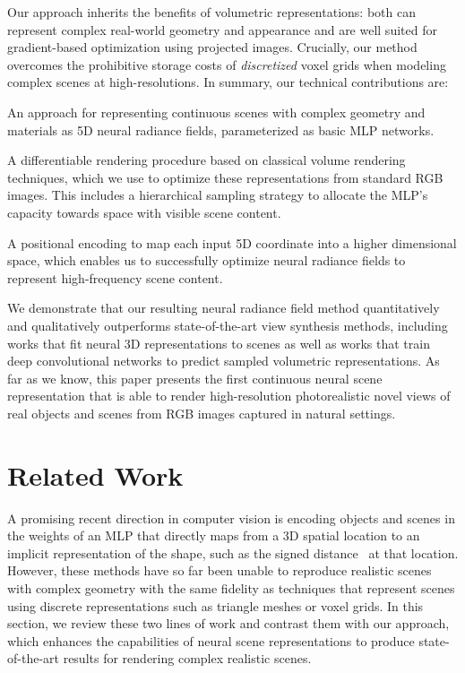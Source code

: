 \documentclass[runningheads]{llncs}
\begin{document}
Our approach inherits the benefits of volumetric representations: both can represent complex real-world geometry and appearance and are well suited for gradient-based optimization using projected images. Crucially, our method overcomes the prohibitive storage costs of \emph{discretized} voxel grids when modeling complex scenes at high-resolutions. In summary, our technical contributions are:
\begin{compactenum}[--]
\item An approach for representing continuous scenes with complex geometry and materials as 5D neural radiance fields, parameterized as basic MLP networks.
\item A differentiable rendering procedure based on classical volume rendering techniques, which we use to optimize these representations from standard RGB images. This includes a hierarchical sampling strategy to allocate the MLP's capacity towards space with visible scene content.
\item A positional encoding to map each input 5D coordinate into a higher dimensional space, which enables us to successfully optimize neural radiance fields to represent high-frequency scene content.
\end{compactenum}
We demonstrate that our resulting neural radiance field method quantitatively and qualitatively outperforms state-of-the-art view synthesis methods, including works that fit neural 3D representations to scenes as well as works that train deep convolutional networks to predict sampled volumetric representations. As far as we know, this paper presents the first continuous neural scene representation that is able to render high-resolution photorealistic novel views of real objects and scenes from RGB images captured in natural settings. 


\section{Related Work}

A promising recent direction in computer vision is encoding objects and scenes in the weights of an MLP that directly maps from a 3D spatial location to an implicit representation of the shape, such as the signed distance~\cite{sdf} at that location. However, these methods have so far been unable to reproduce realistic scenes with complex geometry with the same fidelity as techniques that represent scenes using discrete representations such as triangle meshes or voxel grids. In this section, we review these two lines of work and contrast them with our approach, which enhances the capabilities of neural scene representations to produce state-of-the-art results for rendering complex realistic scenes. 
\end{document}
